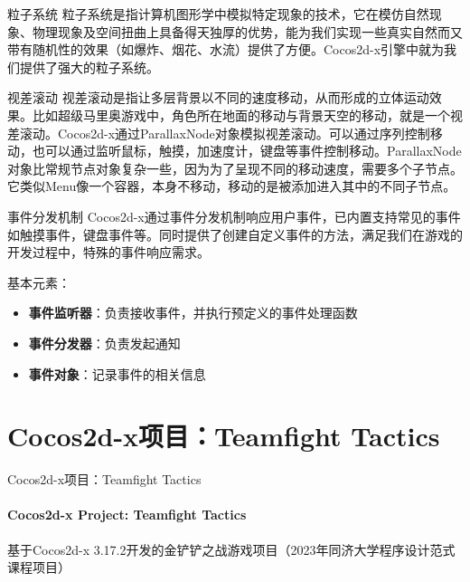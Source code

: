 \documentclass{beamer}
\begin{document}

\begin{frame}[fragile]{粒子系统}
粒子系统是指计算机图形学中模拟特定现象的技术，它在模仿自然现象、物理现象及空间扭曲上具备得天独厚的优势，能为我们实现一些真实自然而又带有随机性的效果（如爆炸、烟花、水流）提供了方便。Cocos2d-x引擎中就为我们提供了强大的粒子系统。
\end{frame}


\begin{frame}[fragile]{视差滚动}
视差滚动是指让多层背景以不同的速度移动，从而形成的立体运动效果。比如超级马里奥游戏中，角色所在地面的移动与背景天空的移动，就是一个视差滚动。Cocos2d-x通过ParallaxNode对象模拟视差滚动。可以通过序列控制移动，也可以通过监听鼠标，触摸，加速度计，键盘等事件控制移动。ParallaxNode对象比常规节点对象复杂一些，因为为了呈现不同的移动速度，需要多个子节点。它类似Menu像一个容器，本身不移动，移动的是被添加进入其中的不同子节点。
\end{frame}


\begin{frame}[fragile]{事件分发机制}
Cocos2d-x通过事件分发机制响应用户事件，已内置支持常见的事件如触摸事件，键盘事件等。同时提供了创建自定义事件的方法，满足我们在游戏的开发过程中，特殊的事件响应需求。

\vspace{1em}

基本元素：
\begin{itemize}
\item \textbf{事件监听器}：负责接收事件，并执行预定义的事件处理函数
\item \textbf{事件分发器}：负责发起通知
\item \textbf{事件对象}：记录事件的相关信息
\end{itemize}
\end{frame}


\section{Cocos2d-x项目：Teamfight Tactics}


\begin{chapter}{}{Cocos2d-x项目：Teamfight Tactics}
\framesubtitle{Cocos2d-x Project: Teamfight Tactics}
基于Cocos2d-x 3.17.2开发的金铲铲之战游戏项目（2023年同济大学程序设计范式课程项目）
\end{chapter}
\end{document}
